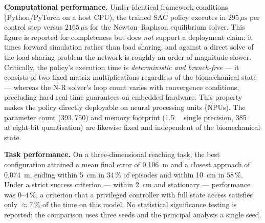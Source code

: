 \documentclass[12pt, a4paper]{article}
\begin{document}
\medskip\noindent
\textbf{Computational performance.}\;
Under identical framework conditions (Python/PyTorch on a host CPU), the
trained SAC policy executes in $295\,\mu\text{s}$ per control step versus
$2165\,\mu\text{s}$ for the Newton--Raphson equilibrium solver. This figure is
reported for completeness but does \emph{not} support a deployment claim: it
times forward simulation rather than load sharing, and against a direct solve
of the load-sharing problem the network is roughly an order of magnitude
slower. Critically, the policy's execution time
is \emph{deterministic and branch-free} --- it consists of two fixed matrix
multiplications regardless of the biomechanical state --- whereas the N-R
solver's loop count varies with convergence conditions, precluding hard
real-time guarantees on embedded hardware. This property makes the policy
directly deployable on neural processing units (NPUs). The parameter count
($393{,}750$) and memory footprint (\SI{1.5}{\mega\byte} single precision,
\SI{385}{\kilo\byte} at eight-bit quantisation) are likewise fixed and
independent of the biomechanical state.

\medskip\noindent
\textbf{Task performance.}\;
On a three-dimensional reaching task, the best configuration attained a mean
final error of \SI{0.106}{\meter} and a closest approach of
\SI{0.074}{\meter}, ending within \SI{5}{\centi\meter} in $34$\,\% of episodes
and within \SI{10}{\centi\meter} in $58$\,\%. Under a strict success criterion
--- within \SI{2}{\centi\meter} and stationary --- performance was
$0$--$4$\,\%, a criterion that a privileged controller with full state access
satisfies only $\approx 7$\,\% of the time on this model. No statistical
significance testing is reported: the comparison uses three seeds and the
principal analysis a single seed.
\end{document}
